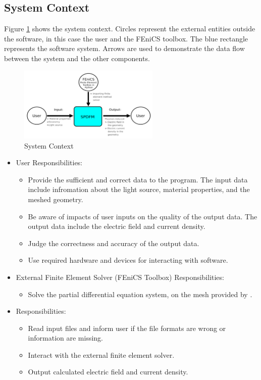 \documentclass[12pt]{article}
\begin{document}
	\subsection{System Context}
	
	Figure \ref{Fig_SystemContext} shows the system context. Circles represent the
	external entities outside the software, in this case the user and the FEniCS
	toolbox. The blue rectangle represents the \progname software system. Arrows
	are used to demonstrate the data flow between the system and the other
	components. \begin{figure}[h!] \begin{center}
			\includegraphics[width=0.6\textwidth]{SystemContextFigure.png} \caption{System
				Context} \label{Fig_SystemContext} \end{center} \end{figure}
	
	
	\begin{itemize} \item User Responsibilities: \begin{itemize} \item Provide the
			sufficient and correct data to the program. The input data include infromation
			about the light source, material properties, and the meshed geometry. \item Be
			aware of impacts of user inputs on the quality of the output data. The output
			data include the electric field and current density. \item Judge the
			correctness and accuracy of the output data. \item Use required hardware and
			devices for interacting with software. \end{itemize}
		
		\item External Finite Element Solver (FEniCS Toolbox) Responsibilities:
		\begin{itemize} \item Solve the partial differential equation system, on the
			mesh provided by \progname{}. \end{itemize}
		
		
		\item \progname{} Responsibilities: \begin{itemize} \item Read input files and
			inform user if the file formats are wrong or information are missing. \item
			Interact with the external finite element solver. \item Output calculated
			electric field and current density. \end{itemize} \end{itemize}
	
\end{document}
